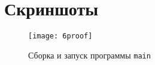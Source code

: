 \section{Скриншоты}

\begin{figure}[H]
    \centering
    \texttt{[image: 6proof]}
    \caption{Сборка и запуск программы \texttt{main}}
  \end{figure}